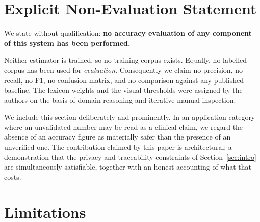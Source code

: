 \documentclass[conference]{IEEEtran}
\begin{document}
\section{Explicit Non-Evaluation Statement}
\label{sec:noeval}

We state without qualification: \textbf{no accuracy evaluation of any
component of this system has been performed.}

Neither estimator is trained, so no training corpus exists. Equally, no
labelled corpus has been used for \emph{evaluation}. Consequently we claim no
precision, no recall, no F1, no confusion matrix, and no comparison against
any published baseline. The lexicon weights and the visual thresholds were
assigned by the authors on the basis of domain reasoning and iterative manual
inspection.

We include this section deliberately and prominently. In an application
category where an unvalidated number may be read as a clinical claim, we
regard the absence of an accuracy figure as materially safer than the presence
of an unverified one. The contribution claimed by this paper is architectural:
a demonstration that the privacy and traceability constraints of
Section~\ref{sec:intro} are simultaneously satisfiable, together with an
honest accounting of what that costs.

\section{Limitations}
\label{sec:limits}
\end{document}
